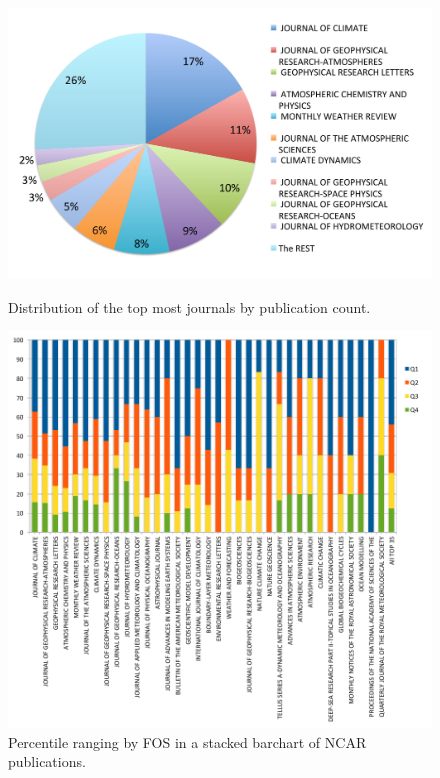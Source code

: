 \documentclass{sig-alternate}
\begin{document}
\begin{figure}[h!] 
  \centering 
    \includegraphics[width=0.75\columnwidth]{images-new/ncar-a.pdf} 
  \caption{Distribution of the top most journals by publication count.}\label{F:ncar-distribution} 

  \centering 
    \includegraphics[width=1.0\columnwidth]{images-new/ncar-b.pdf} 
  \caption{Percentile ranging by FOS in a stacked barchart of NCAR publications.}\label{F:ncar-stacked-b} 


\end{figure}
\end{document}
